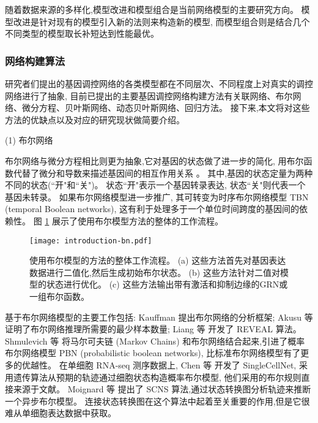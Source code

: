 随着数据来源的多样化,模型改进和模型组合是当前网络模型的主要研究方向。
模型改进是针对现有的模型引入新的法则来构造新的模型,
而模型组合则是结合几个不同类型的模型取长补短达到性能最优。

\subsubsection{网络构建算法}
研究者们提出的基因调控网络的各类模型都在不同层次、不同程度上对真实的调控网络进行了抽象,
目前已提出的主要基因调控网络构建方法有关联网络、布尔网络、微分方程、贝叶斯网络、动态贝叶斯网络、回归方法。
接下来,本文将对这些方法的优缺点以及对应的研究现状做简要介绍。

(1) 布尔网络

布尔网络与微分方程相比则更为抽象,它对基因的状态做了进一步的简化,
用布尔函数代替了微分和导数来描述基因间的相互作用关系 \cite{shmulevich2002probabilistic,kim2007boolean,bornholdt2008boolean,zhou2016relative} 。
其中,基因的状态定量为两种不同的状态(``开"和``关")。
状态``开"表示一个基因转录表达, 状态``关"则代表一个基因未转录。
如果布尔网络模型进一步推广, 其可转变为时序布尔网络模型 TBN (temporal Boolean networks), 这有利于处理多于一个单位时间跨度的基因间的依赖性。
图 \ref{fig:pre-bn} 展示了使用布尔模型方法的整体的工作流程。
\begin{figure}[!htbp]
    \centering
    \texttt{[image: introduction-bn.pdf]}
    \caption{
        使用布尔模型的方法的整体工作流程。
        (a) 这些方法首先对基因表达数据进行二值化,然后生成初始布尔状态。
        (b) 这些方法针对二值对模型的状态进行优化。
        (c) 这些方法输出带有激活和抑制边缘的GRN或一组布尔函数。
    }
    \label{fig:pre-bn}
\end{figure}

基于布尔网络模型的主要工作包括:
 Kauffman \cite{kauffman2003random} 提出布尔网络的分析框架;
Akusu 等 \cite{akutsu1999identification} 证明了布尔网络推理所需要的最少样本数量;
Liang 等 \cite{liang1998reveal} 开发了 REVEAL 算法。
Shmulevich 等 \cite{marshall2007inference} 将马尔可夫链 (Markov Chains) 和布尔网络结合起来,引进了概率布尔网络模型 PBN (probabilistic boolean networks),
比标准布尔网络模型有了更多的优越性。
在单细胞 RNA-seq 测序数据上,
Chen 等 \cite{chen2014single} 开发了 SingleCellNet,
采用遗传算法从预期的轨迹通过细胞状态构造概率布尔模型, 他们采用的布尔规则直接来源于文献。
Moignard 等 \cite{moignard2015decoding} 提出了 SCNS 算法,通过状态转换图分析轨迹来推断一个异步布尔模型。
连接状态转换图在这个算法中起着至关重要的作用,但是它很难从单细胞表达数据中获取。

